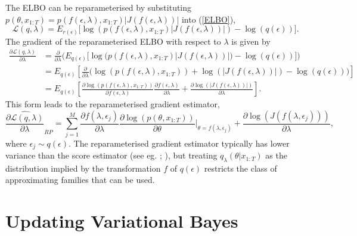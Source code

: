 \documentclass[12pt,a4paper]{article}\usepackage[]{graphicx}\usepackage[]{color}
\begin{document}
The ELBO can be reparameterised by substituting $p(\theta, x_{1:T}) = p(f(\epsilon, \lambda), x_{1:T})|J(f(\epsilon, \lambda))|$ into (\ref{ELBO}),
\begin{equation}
\label{rpELBO}
\mathcal{L}(q, \lambda) = E_{r(\epsilon)} \bigg[\log(p(f(\epsilon,\lambda), x_{1:T})|J(f(\epsilon, \lambda))|) - \log(q(\epsilon))\bigg].
\end{equation}
The gradient of the reparameterised ELBO with respect to $\lambda$ is given by 
\begin{align}
\label{rpELBODeriv}
\frac{\partial\mathcal{L}(q, \lambda)}{\partial \lambda} &= \frac{\partial}{\partial \lambda} \bigg( E_{q(\epsilon)} \bigg[\log\big(p(f(\epsilon,\lambda), x_{1:T})|J(f(\epsilon, \lambda))|\big) - \log(q(\epsilon))\bigg] \bigg) \nonumber \\
&= E_{q(\epsilon)} \left[ \frac{\partial}{\partial \lambda} \bigg(\log(p(f(\epsilon,\lambda), x_{1:T})) + \log(|J(f(\epsilon, \lambda))|) - \log(q(\epsilon)) \bigg)\right] \nonumber \\
&= E_{q(\epsilon)} \left[ \frac{\partial \log(p(f(\epsilon,\lambda), x_{1:T}))}{\partial f(\epsilon,\lambda)} \frac{\partial f(\epsilon,\lambda)}{\partial \lambda}  + \frac{\partial \log(|J(f(\epsilon, \lambda))|)}{\partial \lambda} \right].
\end{align}
This form leads to the reparameterised gradient estimator,
\begin{equation}
\label{rpDeriv}
\widehat{\frac{\partial\mathcal{L}(q, \lambda)}{\partial \lambda}}_{RP} = \sum_{j = 1}^M \frac{\partial f(\lambda, \epsilon_j)}{\partial \lambda} \frac{\partial \log(p(\theta, x_{1:T}))}{\partial \theta} \bigg\rvert_{\theta = f(\lambda, \epsilon_j)} + \frac{\partial \log(J(f(\lambda, \epsilon_j)))}{\partial \lambda}, 
\end{equation}
where $\epsilon_j \sim q(\epsilon)$. The reparameterised gradient estimator typically has lower variance than the score estimator (see eg. \cite{Rezende2014}; \cite{Ruiz2016}), but treating $q_{\lambda}(\theta | x_{1:T})$ as the distribution implied by the transformation $f$ of $q(\epsilon)$ restricts the class of approximating families that can be used.
\\

\section{Updating Variational Bayes}
\label{sec:UVB}
\end{document}
